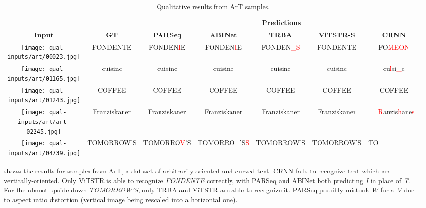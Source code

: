 \begin{table*}[htbp]
  \centering
  \footnotesize
  \setlength\tabcolsep{2pt}
  \caption{Qualitative results from ArT samples.}
  \begin{tabular}{ c c c c c c c }
    \toprule
    & & \multicolumn{5}{c}{\textbf{Predictions}} \\
    \cmidrule{3-7}
    \textbf{Input} & \textbf{GT} & \textbf{PARSeq} & \textbf{ABINet} & \textbf{TRBA} & \textbf{ViTSTR-S} & \textbf{CRNN} \\
    \midrule
    \texttt{[image: qual-inputs/art/00023.jpg]} & {\scriptsize FONDENTE} & {\scriptsize FONDEN\textcolor{red}{I}E} & {\scriptsize FONDEN\textcolor{red}{I}E} & {\scriptsize FONDEN\textcolor{red}{\_S}} & {\scriptsize FONDENTE} & {\scriptsize FO\textcolor{red}{MEON}} \\
    \texttt{[image: qual-inputs/art/01165.jpg]} & cuisine & cuisine & cuisine & cuisine & cuisine & cu\textcolor{red}{l}si\textcolor{red}{\_}e \\
    \texttt{[image: qual-inputs/art/01243.jpg]} & COFFEE & COFFEE & COFFEE & COFFEE & COFFEE & COFFEE \\
    \texttt{[image: qual-inputs/art/art-02245.jpg]} & {\scriptsize Franziskaner} & {\scriptsize Franziskaner} & {\scriptsize Franziskaner} & {\scriptsize Franziskaner} & {\scriptsize Franziskaner} & {\scriptsize\textcolor{red}{\_R}anzis\textcolor{red}{h}ane\textcolor{red}{s}} \\
    \texttt{[image: qual-inputs/art/04739.jpg]} & {\tiny TOMORROW'S} & {\tiny TOMORRO\textcolor{red}{V}'S} & {\tiny TOMORRO\textcolor{red}{\_}'S\textcolor{red}{S}} & {\tiny TOMORROW'S} & {\tiny TOMORROW'S} & {\tiny TO\textcolor{red}{\_\_\_\_\_\_\_\_}} \\
    \bottomrule
  \end{tabular}
  \label{tab:qual-results-art}
\end{table*}



 shows the results for samples from ArT, a dataset of arbitrarily-oriented and curved text. CRNN fails to recognize text which are vertically-oriented. Only ViTSTR is able to recognize \textit{FONDENTE} correctly, with PARSeq and ABINet both predicting \textit{I} in place of \textit{T}. For the almost upside down \textit{TOMORROW'S}, only TRBA and ViTSTR are able to recognize it. PARSeq possibly mistook \textit{W} for a \textit{V} due to aspect ratio distortion (vertical image being rescaled into a horizontal one).


